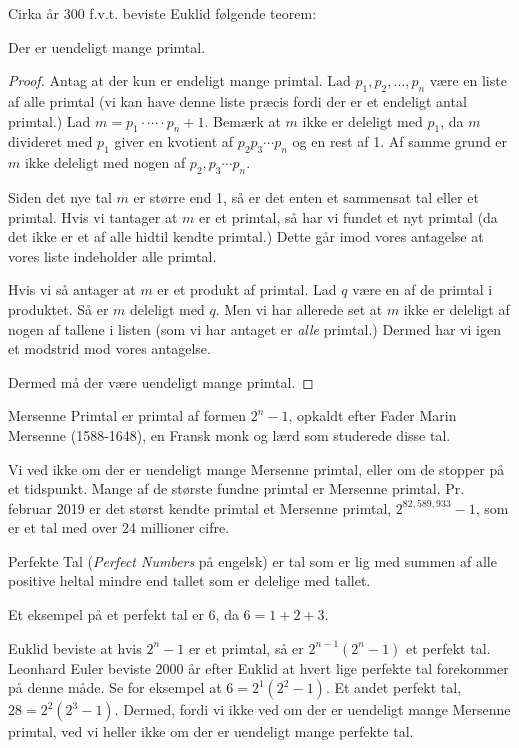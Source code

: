 Cirka år 300 f.v.t. beviste Euklid  følgende teorem:
\begin{theorem}
Der er uendeligt mange primtal.
\end{theorem}
\begin{proof}
  Antag at der kun er endeligt mange primtal. Lad $p_{1}, p_{2}, \ldots, p_{n}$ være en liste af alle primtal (vi kan have denne liste præcis fordi der er et endeligt antal primtal.) Lad $m = p_{1} \cdot \cdots \cdot p_{n}+1$. Bemærk at $m$ ikke er deleligt med $p_{1}$, da $m$ divideret med $p_{1}$ giver en kvotient af $p_{2}p_{3}\cdots p_n$ og en rest af 1. Af samme grund er $m$ ikke deleligt med nogen af $p_{2}, p_{3} \cdots p_{n}$.

  Siden det nye tal $m$ er større end 1, så er det enten et sammensat tal eller et primtal. Hvis vi tantager at $m$ er et primtal, så har vi fundet et nyt primtal (da det ikke er et af alle hidtil kendte primtal.) Dette går imod vores antagelse at vores liste indeholder alle primtal.

  Hvis vi så antager at $m$ er et produkt af primtal. Lad $q$ være en af de primtal i produktet. Så er $m$ deleligt med $q$. Men vi har allerede set at $m$ ikke er deleligt af nogen af tallene i listen (som vi har antaget er \textit{alle} primtal.) Dermed har vi igen et modstrid mod vores antagelse.

  Dermed må der være uendeligt mange primtal.
\end{proof}

\begin{definition}
  Mersenne Primtal er primtal af formen $2^{n}-1$, opkaldt efter Fader Marin Mersenne (1588-1648), en Fransk monk og lærd som studerede disse tal.
\end{definition}

Vi ved ikke om der er uendeligt mange Mersenne primtal, eller om de stopper på et tidspunkt. Mange af de største fundne primtal er Mersenne primtal. Pr. februar 2019 er det størst kendte primtal et Mersenne primtal, $2^{82,589,933}-1$, som er et tal med over 24 millioner cifre.

\begin{definition}
Perfekte Tal (\textit{Perfect Numbers} på engelsk) er tal som er lig med summen af alle positive heltal mindre end tallet som er delelige med tallet.
\end{definition}

Et eksempel på et perfekt tal er 6, da $6 = 1 + 2 + 3$.

Euklid beviste at hvis $2^{n}-1$ er et primtal, så er $2^{n-1}(2^{n}-1)$ et perfekt tal. Leonhard Euler  beviste 2000 år efter Euklid at hvert lige perfekte tal forekommer på denne måde. Se for eksempel at $6 = 2^{1}(2^{2}-1)$. Et andet perfekt tal, $28 = 2^{2}(2^{3}-1)$. Dermed, fordi vi ikke ved om der er uendeligt mange Mersenne primtal, ved vi heller ikke om der er uendeligt mange perfekte tal.

